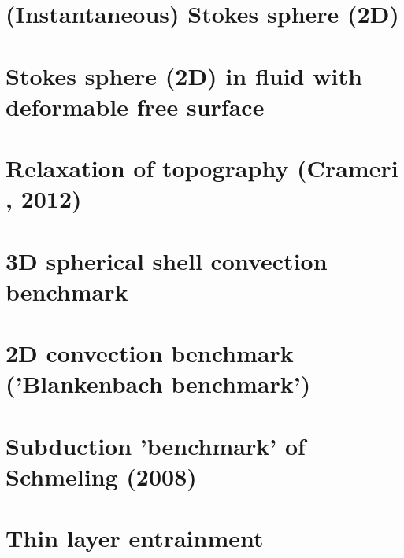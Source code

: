 \newpage
\section{(Instantaneous) Stokes sphere (2D)} \label{ss:stokes_sphere2D}


\newpage
\section{Stokes sphere (2D) in fluid with deformable free surface} \label{ss:stokes_sphere_fs2D}


\section{Relaxation of topography (Crameri \etal, 2012)} \label{ss:crsg12}


\section{3D spherical shell convection benchmark} \label{ss:sscb3D}


\section{2D convection benchmark ('Blankenbach \etal benchmark')} \label{ss:blbc89}


\section{Subduction 'benchmark' of Schmeling \etal (2008)}


\section{Thin layer entrainment} \label{sec:tlentr}


